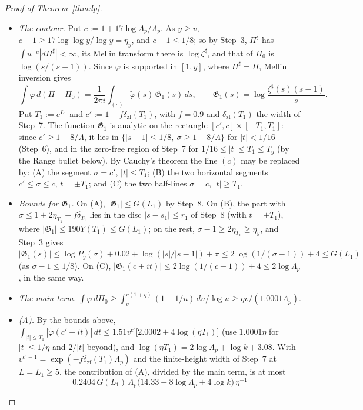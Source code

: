 \begin{proof}[Proof of Theorem~\ref{thm:lp}]
\begin{itemize}
  Since $T_1\omega=e^{L_1}\eta\Lambda_p^{-2}/4=e^{3.08}k/4\ge2ek$, we have $(k/(|t|\omega))^k\le(2e)^{-k}(T_1/|t|)^k$ for $|t|\ge T_1$.
\item \emph{The contour.} Put $c:=1+17\log\Lambda_p/\Lambda_p$. As $y\ge v$, $c-1\ge17\log\log y/\log y=\eta_y$, and $c-1\le1/8$; so
  by Step~3, $\Pi^\sharp$ has $\int u^{-c}|d\Pi^\sharp|<\infty$, its Mellin transform there is $\log\zeta^\sharp$, and that of $\Pi_0$ is
  $\log(s/(s-1))$. Since $\varphi$ is supported in $[1,y]$, where $\Pi^\sharp=\Pi$, Mellin inversion gives
  \[
    \int\varphi\,d(\Pi-\Pi_0)=\frac1{2\pi i}\int_{(c)}\tilde\varphi(s)\,\mathfrak G_1(s)\,ds,\qquad\mathfrak G_1(s)=\log\frac{\zeta^\sharp(s)(s-1)}s .
  \]
  Put $T_1:=e^{L_1}$ and $c':=1-f\delta_{\mathrm{zf}}(T_1)$, with $f=0.9$ and $\delta_{\mathrm{zf}}(T_1)$ the width of Step~7. The function
  $\mathfrak G_1$ is analytic on the rectangle $[c',c]\times[-T_1,T_1]$: since $c'\ge1-8/\Lambda$, it lies in
$\{|s-1|\le1/8,\ \sigma\ge1-8/\Lambda\}$ for $|t|<1/16$ (Step~6), and in the
  zero-free region of Step~7 for $1/16\le|t|\le T_1\le T_y$ (by the Range bullet below). By Cauchy's theorem the line $(c)$ may be
  replaced by: (A) the segment $\sigma=c'$, $|t|\le T_1$; (B) the two horizontal segments $c'\le\sigma\le c$, $t=\pm T_1$; and
  (C) the two half-lines $\sigma=c$, $|t|\ge T_1$.
\item \emph{Bounds for $\mathfrak G_1$.} On (A), $|\mathfrak G_1|\le G(L_1)$ by Step~8. On (B), the part with
  $\sigma\le1+2\eta_{T_1}+f\delta_{T_1}$ lies in the disc $|s-s_1|\le r_1$ of Step~8 (with $t=\pm T_1$), where
  $|\mathfrak G_1|\le190Y(T_1)\le G(L_1)$; on the rest, $\sigma-1\ge2\eta_{T_1}\ge\eta_y$, and Step~3 gives
  $|\mathfrak G_1(s)|\le\log P_y(\sigma)+0.02+\log(|s|/|s-1|)+\pi\le2\log(1/(\sigma-1))+4\le G(L_1)$ (as $\sigma-1\le1/8$). On
  (C), $|\mathfrak G_1(c+it)|\le2\log(1/(c-1))+4\le2\log\Lambda_p$, in the same way.
\item \emph{The main term.} $\int\varphi\,d\Pi_0\ge\int_v^{v(1+\eta)}(1-1/u)\,du/\log u\ge\eta v/(1.0001\Lambda_p)$.
\item \emph{(A).} By the bounds above, $\int_{|t|\le T_1}|\tilde\varphi(c'+it)|\,dt\le1.51v^{c'}\big[2.0002+4\log(\eta T_1)\big]$ (use
  $1.0001\eta$ for $|t|\le1/\eta$ and $2/|t|$ beyond), and $\log(\eta T_1)=2\log\Lambda_p+\log k+3.08$. With
  $v^{c'-1}=\exp(-f\delta_{\mathrm{zf}}(T_1)\Lambda_p)$ and the finite-height width of Step~7 at $L=L_1\ge5$, the contribution of
  (A), divided by the main term, is at most
  \[
    0.2404\,G(L_1)\,\Lambda_p\big(14.33+8\log\Lambda_p+4\log k\big)\,\eta^{-1}
\]
\end{itemize}
\end{proof}
